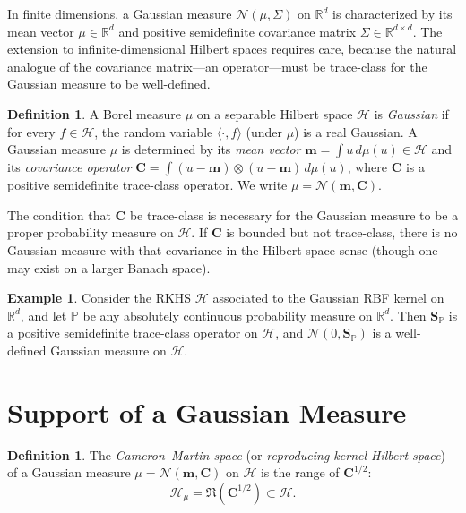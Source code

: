 \documentclass[12pt, oneside]{book}
\theoremstyle{plain}
\theoremstyle{definition}
\newtheorem{definition}[theorem]{Definition}
\newtheorem{example}[theorem]{Example}
\newcommand{\R}{\mathbb{R}}
\newcommand{\calH}{\mathcal{H}}
\newcommand{\calN}{\mathcal{N}}
\newcommand{\PP}{\mathbb{P}}
\newcommand{\ran}{\mathfrak{R}}
\newcommand{\SP}{\mathbf{S}_{\PP}}
\begin{document}
In finite dimensions, a Gaussian measure $\calN(\mu, \Sigma)$ on $\R^d$ is characterized by its mean vector $\mu \in \R^d$ and positive semidefinite covariance matrix $\Sigma \in \R^{d \times d}$. The extension to infinite-dimensional Hilbert spaces requires care, because the natural analogue of the covariance matrix---an operator---must be trace-class for the Gaussian measure to be well-defined.

\begin{definition}
A Borel measure $\mu$ on a separable Hilbert space $\calH$ is \emph{Gaussian} if for every $f \in \calH$, the random variable $\langle \cdot, f \rangle$ (under $\mu$) is a real Gaussian. A Gaussian measure $\mu$ is determined by its \emph{mean vector} $\mathbf{m} = \int u\, d\mu(u) \in \calH$ and its \emph{covariance operator} $\mathbf{C} = \int (u - \mathbf{m}) \otimes (u - \mathbf{m})\, d\mu(u)$, where $\mathbf{C}$ is a positive semidefinite trace-class operator. We write $\mu = \calN(\mathbf{m}, \mathbf{C})$.
\end{definition}

The condition that $\mathbf{C}$ be trace-class is necessary for the Gaussian measure to be a proper probability measure on $\calH$. If $\mathbf{C}$ is bounded but not trace-class, there is no Gaussian measure with that covariance in the Hilbert space sense (though one may exist on a larger Banach space).

\begin{example}
Consider the RKHS $\calH$ associated to the Gaussian RBF kernel on $\R^d$, and let $\PP$ be any absolutely continuous probability measure on $\R^d$. Then $\SP$ is a positive semidefinite trace-class operator on $\calH$, and $\calN(0, \SP)$ is a well-defined Gaussian measure on $\calH$.
\end{example}

\section{Support of a Gaussian Measure}

\begin{definition}
The \emph{Cameron--Martin space} (or \emph{reproducing kernel Hilbert space}) of a Gaussian measure $\mu = \calN(\mathbf{m}, \mathbf{C})$ on $\calH$ is the range of $\mathbf{C}^{1/2}$:
\begin{equation}
\calH_\mu = \ran(\mathbf{C}^{1/2}) \subset \calH.
\end{equation}
\end{definition}
\end{document}
